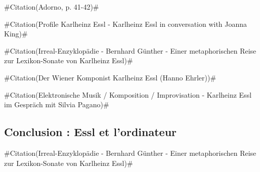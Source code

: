 \documentclass[a4paper,12pt]{article}
\newcommand{\guill}[1]{«~#1~»}
\newcommand{\zitat}[2]{\#Citation(#2)\#}
\begin{document}
\zitat{Contrainte par la logique de ses propres faits, la musique, en un mouvement critique, a dissous l'idée d'œuvre achevée et rompu avec le public. [\dots] Les seules œuvres qui comptent aujourd'hui sont celles qui ne sont plus des \guill{œuvres}.}
{Adorno, p. 41-42}

\zitat{I want to challenge the listener not just to consume the piece but by listening becoming something like a co-creator, being a partner of the composer and the composition itself.}
{Profile Karlheinz Essl - Karlheinz Essl in conversation with Joanna King}

\zitat{Die Lexikon-Sonate ist voll absurder Situationen; die isolierten Musiksprachfetzen aus der Geschichte der Klaviermusik werden in immer neuen ZUFALLSNACHBARSCHAFTEN zusammengesetzt; sie rufen Erinnerungen hervor, die aber aus dem Kontext gerissen und in eine irrationale Struktur eingebunden werden.}
{Irreal-Enzyklopädie - Bernhard Günther - Einer metaphorischen Reise zur Lexikon-Sonate von Karlheinz Essl}

\zitat{Einer der Ausgangspunkt ist meine Hassliebe zu diesem Instrument, dem Klavier. Ich wurde mit sieben Jahren gezwungen, Klavier zu lernen; ich wollte Blockflöte spielen. Trotzdem war ich am Klavier nie gut. Es war immer frustrierend, zu sehen, dass ich das, was ich im Kopf hatte, auf den Tasten nicht adäquat umsetzen konnte. Meine ersten Kompositionversuche waren natürlich trotzdem Klavierstücke, aber ich habe sonst kein einziges Klavierstück geschrieben bis jetzt, und ich kann mir auch nicht vorstellen, ein Klavierstück zu schreiben. Das einzige, was mir möglich war: Ein Klavierstück zu machen, das ganz absurde Kriterien erfüllt.}
{Der Wiener Komponist Karlheinz Essl (Hanno Ehrler)}

\zitat{Ein Computer wird nie müde. Mit dem Computer kann man eine Musik in Szene setzen, die nie aufhört, das geht mit Musikern natürlich nicht.}
{Elektronische Musik / Komposition / Improvisation - Karlheinz Essl im Gespräch mit Silvia Pagano}

\subsection{Conclusion : Essl et l'ordinateur}

\zitat{Essl nutzt die heutigen Möglichkeiten der TECHNIK als Mittel, musikalische Möglichkeitsstrukturen zu schaffen, die in der Lage sind, unbeliebig Anderes zu realisieren als die Vorstellung des Komponisten.}
{Irreal-Enzyklopädie - Bernhard Günther - Einer metaphorischen Reise zur Lexikon-Sonate von Karlheinz Essl}
\end{document}
